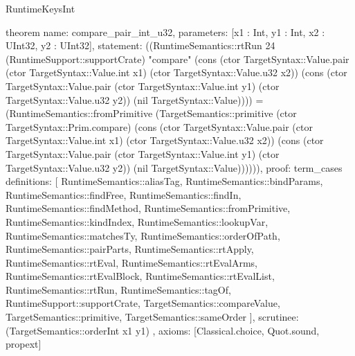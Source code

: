 \begin{lexlean}{RuntimeKeysInt}
\begin{semanticmodule}
theorem{
  name: compare_pair_int_u32,
  parameters: [x1 : Int, y1 : Int, x2 : UInt32, y2 : UInt32],
  statement: ((RuntimeSemantics::rtRun 24 (RuntimeSupport::supportCrate) "compare" (cons (ctor TargetSyntax::Value.pair (ctor TargetSyntax::Value.int x1) (ctor TargetSyntax::Value.u32 x2)) (cons (ctor TargetSyntax::Value.pair (ctor TargetSyntax::Value.int y1) (ctor TargetSyntax::Value.u32 y2)) (nil TargetSyntax::Value)))) = (RuntimeSemantics::fromPrimitive (TargetSemantics::primitive (ctor TargetSyntax::Prim.compare) (cons (ctor TargetSyntax::Value.pair (ctor TargetSyntax::Value.int x1) (ctor TargetSyntax::Value.u32 x2)) (cons (ctor TargetSyntax::Value.pair (ctor TargetSyntax::Value.int y1) (ctor TargetSyntax::Value.u32 y2)) (nil TargetSyntax::Value)))))),
  proof: term_cases{
    definitions: [
      RuntimeSemantics::aliasTag,
      RuntimeSemantics::bindParams,
      RuntimeSemantics::findFree,
      RuntimeSemantics::findIn,
      RuntimeSemantics::findMethod,
      RuntimeSemantics::fromPrimitive,
      RuntimeSemantics::kindIndex,
      RuntimeSemantics::lookupVar,
      RuntimeSemantics::matchesTy,
      RuntimeSemantics::orderOfPath,
      RuntimeSemantics::pairParts,
      RuntimeSemantics::rtApply,
      RuntimeSemantics::rtEval,
      RuntimeSemantics::rtEvalArms,
      RuntimeSemantics::rtEvalBlock,
      RuntimeSemantics::rtEvalList,
      RuntimeSemantics::rtRun,
      RuntimeSemantics::tagOf,
      RuntimeSupport::supportCrate,
      TargetSemantics::compareValue,
      TargetSemantics::primitive,
      TargetSemantics::sameOrder
    ],
    scrutinee: (TargetSemantics::orderInt x1 y1)
  },
  axioms: [Classical.choice, Quot.sound, propext]
}


\end{semanticmodule}
\end{lexlean}
